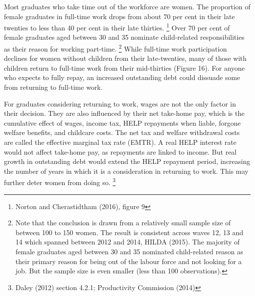 \documentclass[embargoed]{grattan}
\begin{document}
Most graduates who take time out of the workforce are women.
The proportion of female graduates in full-time work drops from about 70 per cent in their late twenties to less than 40 per cent in their late thirties.%
\footnote{Norton and Cherastidtham (2016), figure 9} Over 70 per cent of female graduates aged between 30 and 35 nominate child-related responsibilities as their reason for working part-time.%
\footnote{Note that the conclusion is drawn from a relatively small sample size of between 100 to 150 women.
The result is consistent across waves 12, 13 and 14 which spanned between 2012 and 2014, HILDA (2015).
The majority of female graduates aged between 30 and 35 nominated child-related reason as their primary reason for being out of the labour force and not looking for a job.
But the sample size is even smaller (less than 100 observations).} While full-time work participation declines for women without children from their late-twenties, many of those with children return to full-time work from their mid-thirties (Figure 16).
For anyone who expects to fully repay, an increased outstanding debt could dissuade some from returning to full-time work.

For graduates considering returning to work, wages are not the only factor in their decision.
They are also influenced by their net take-home pay, which is the cumulative effect of wages, income tax, HELP repayments when liable, forgone welfare benefits, and childcare costs.
The net tax and welfare withdrawal costs are called the effective marginal tax rate (EMTR).
A real HELP interest rate would not affect take-home pay, as repayments are linked to income.
But real growth in outstanding debt would extend the HELP repayment period, increasing the number of years in which it is a consideration in returning to work.
This may further deter women from doing so.%
\footnote{Daley (2012) section 4.2.1; Productivity Commission (2014)}
\end{document}
